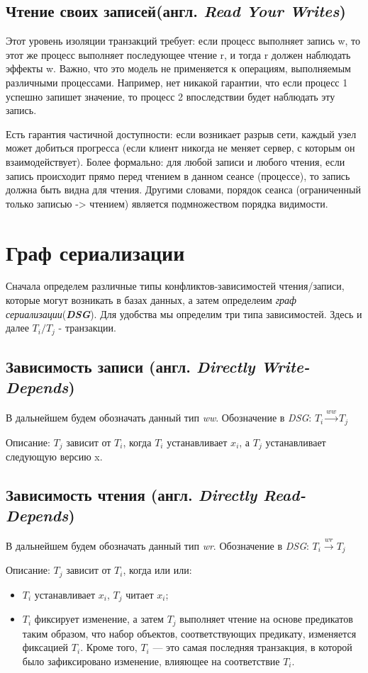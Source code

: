 \documentclass[12pt,  openany]{book}
\begin{document}
\subsection{Чтение своих записей(англ.  \textit{Read Your Writes})}
Этот уровень изоляции транзакций требует: если процесс выполняет запись w, то этот же процесс выполняет последующее чтение r, и тогда r должен наблюдать эффекты w.
Важно, что это модель не применяется к операциям, выполняемым различными процессами. Например, нет никакой гарантии, что если процесс 1 успешно запишет значение, то процесс 2 впоследствии будет наблюдать эту запись.
\par
Есть гарантия частичной доступности: если возникает разрыв сети, каждый узел может добиться прогресса (если клиент никогда не меняет сервер, с которым он взаимодействует).
Более формально: для любой записи и любого чтения, если запись происходит прямо перед чтением в данном сеансе (процессе), то запись должна быть видна для чтения. Другими словами, порядок сеанса (ограниченный только записью -> чтением) является подмножеством порядка видимости.

\section{Граф сериализации \cite{IsolationLevelDefinitions} \cite{IsolationLevelDefinitions2}}
Сначала определем различные типы конфликтов-зависимостей чтения/записи, которые могут возникать в базах данных, а затем определеим \textit{граф сериализации}(\textit{\textbf{DSG}}). Для удобства мы определим три типа зависимостей.
Здесь и далее $T_i/T_j$ - транзакции.
\subsection{Зависимость записи (англ. \textit{Directly Write-Depends})}
В дальнейшем будем обозначать данный тип \textit{ww}. Обозначение в \textit{DSG}: $T_i  \xrightarrow{\textit{ww}} T_j$
\par
Описание: $T_j$ зависит от $T_i$, когда $T_i$ устанавливает $x_i$, а $T_j$ устанавливает следующую версию x.
\subsection{Зависимость чтения (англ. \textit{Directly Read-Depends})}
В дальнейшем будем обозначать данный тип \textit{wr}. Обозначение в \textit{DSG}: $T_i  \xrightarrow{\textit{wr}} T_j$
\par
Описание: $T_j$ зависит от $T_i$,  когда или или:
\begin{itemize}
\item $T_i$ устанавливает $x_i$, $T_j$ читает $x_i$;
\item $T_i$ фиксирует изменение, а затем $T_j$ выполняет чтение на основе предикатов таким образом, что набор объектов, соответствующих предикату, изменяется фиксацией $T_i$.   Кроме того, $T_i$ --- это самая последняя транзакция, в которой было зафиксировано изменение, влияющее на соответствие $T_i$.
\end{itemize}
\end{document}
